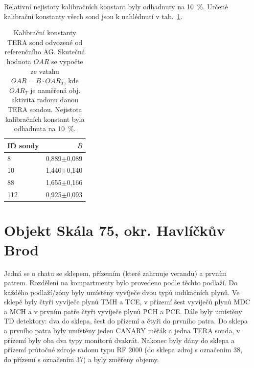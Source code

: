 Relativní nejistoty kalibračních konstant byly odhadnuty na 10~\%. Určené kalibrační konstanty všech sond jsou k nahlédnutí v tab.~\ref{tab:dynMer_sondyB}. %
\begin{table}[ht]
	\centering
	\caption{Kalibrační konstanty TERA sond odvozené od referenčního AG. Skutečná hodnota $OAR$ se vypočte ze vztahu $OAR=B\cdot OAR_T$, kde $OAR_T$ je naměřená obj. aktivita radonu danou TERA sondou. Nejistota kalibračních konstant byla odhadnuta na 10~\%.}
	\label{tab:dynMer_sondyB}
	\begin{tabular}{lr}
		\toprule
		ID sondy &     $B$ \\
		\midrule
		8   & 0,889$\pm$0,089\\
		10  & 1,440$\pm$0,140\\
		88  & 1,655$\pm$0,166\\
		112 & 0,925$\pm$0,093\\
		\bottomrule
	\end{tabular}
\end{table}

\section{Objekt Skála 75, okr. Havlíčkův Brod}

Jedná se o chatu se sklepem, přízemím (které zahrnuje verandu) a prvním patrem. Rozdělení na kompartmenty bylo provedeno podle těchto podlaží. Do každého podlaží/zóny byly umístěny vyvíječe dvou typů indikačních plynů. Ve sklepě byly čtyři vyvíječe plynů TMH a TCE, v přízemí šest vyvíječů plynů MDC a MCH a v prvním patře čtyři vyvíječe plynů PCH a PCE. Dále byly umístěny TD detektory: dva do sklepa, šest do přízemí a čtyři do prvního patra. Do sklepa a prvního patra byly umístěny jeden CANARY měřák a jedna TERA sonda, v přízemí byly oba dva typy monitorů dvakrát. Nakonec byly dány do sklepa a přízemí průtočné zdroje radonu typu RF 2000 (do sklepa zdroj s označením 38, do přízemí s označením 37) a byly změřeny objemy. 

